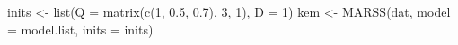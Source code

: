 \begin{Schunk}
\begin{Sinput}
 inits <- list(Q = matrix(c(1, 0.5, 0.7), 3, 1), D = 1)
 kem <- MARSS(dat, model = model.list, inits = inits)
\end{Sinput}
\end{Schunk}
